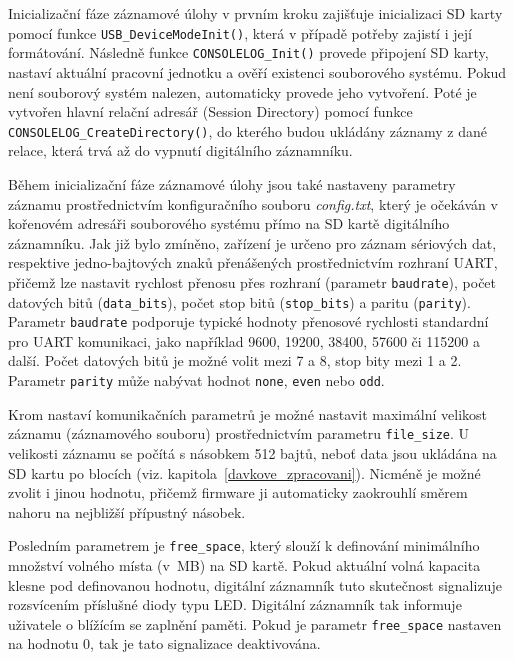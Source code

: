 Inicializační fáze záznamové úlohy v prvním kroku zajišťuje inicializaci SD karty pomocí funkce \texttt{USB\_DeviceModeInit()}, která v případě potřeby zajistí i její formátování. Následně funkce \texttt{CONSOLELOG\_Init()} provede připojení SD karty, nastaví aktuální pracovní jednotku a ověří existenci souborového systému. Pokud není souborový systém nalezen, automaticky provede jeho vytvoření. Poté je vytvořen hlavní relační adresář (Session Directory) pomocí funkce \texttt{CONSOLELOG\_CreateDirectory()}, do kterého budou ukládány záznamy z dané relace, která trvá až do vypnutí digitálního záznamníku.


Během inicializační fáze záznamové úlohy jsou také nastaveny parametry záznamu prostřednictvím konfiguračního souboru \textit{config.txt}, který je očekáván v kořenovém adresáři souborového systému přímo na SD kartě digitálního záznamníku. Jak již bylo zmíněno, zařízení je určeno pro záznam sériových dat, respektive jedno-bajtových znaků přenášených prostřednictvím rozhraní UART, přičemž lze nastavit rychlost přenosu přes rozhraní (parametr \texttt{baudrate}), počet datových bitů (\texttt{data\_bits}), počet stop bitů (\texttt{stop\_bits}) a paritu (\texttt{parity}). Parametr \texttt{baudrate} podporuje typické hodnoty přenosové rychlosti standardní pro UART komunikaci, jako například 9600, 19200, 38400, 57600 či 115200 a další. Počet datových bitů je možné volit mezi 7 a 8, stop bity mezi 1 a 2. Parametr \texttt{parity} může nabývat hodnot \texttt{none}, \texttt{even} nebo \texttt{odd}.

Krom nastaví komunikačních parametrů je možné nastavit maximální velikost záznamu (záznamového souboru) prostřednictvím parametru \texttt{file\_size}. U velikosti záznamu se počítá s násobkem 512 bajtů, neboť data jsou ukládána na SD kartu po blocích (viz. kapitola~\ref{davkove_zpracovani}). Nicméně je možné zvolit i jinou hodnotu, přičemž firmware ji automaticky zaokrouhlí směrem nahoru na nejbližší přípustný násobek. 

Posledním parametrem je \texttt{free\_space}, který slouží k definování minimálního množství volného místa (v~MB) na SD kartě. Pokud aktuální volná kapacita klesne pod definovanou hodnotu, digitální záznamník tuto skutečnost signalizuje rozsvícením příslušné diody typu LED. Digitální záznamník tak informuje uživatele o blížícím se zaplnění paměti. Pokud je parametr \texttt{free\_space} nastaven na hodnotu 0, tak je tato signalizace deaktivována.

